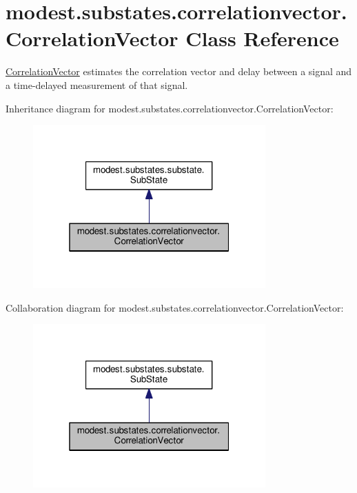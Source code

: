 \hypertarget{classmodest_1_1substates_1_1correlationvector_1_1CorrelationVector}{}\section{modest.\+substates.\+correlationvector.\+Correlation\+Vector Class Reference}
\label{classmodest_1_1substates_1_1correlationvector_1_1CorrelationVector}


\hyperlink{classmodest_1_1substates_1_1correlationvector_1_1CorrelationVector}{Correlation\+Vector} estimates the correlation vector and delay between a signal and a time-\/delayed measurement of that signal.  




Inheritance diagram for modest.\+substates.\+correlationvector.\+Correlation\+Vector\+:
\nopagebreak
\begin{figure}[H]
\begin{center}
\leavevmode
\includegraphics[width=253pt]{classmodest_1_1substates_1_1correlationvector_1_1CorrelationVector__inherit__graph}
\end{center}
\end{figure}


Collaboration diagram for modest.\+substates.\+correlationvector.\+Correlation\+Vector\+:
\nopagebreak
\begin{figure}[H]
\begin{center}
\leavevmode
\includegraphics[width=253pt]{classmodest_1_1substates_1_1correlationvector_1_1CorrelationVector__coll__graph}
\end{center}
\end{figure}
